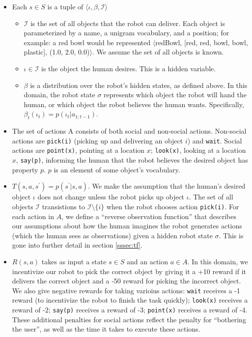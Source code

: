 \documentclass{article}
\newcommand{\Iota}{\mathcal{I}}
\begin{document}
\begin{itemize}
	\item Each $s \in S$ is a tuple of $\langle \iota, \beta, \Iota \rangle$		\begin{itemize}
			\item $\Iota$ is the set of all objects that the robot can deliver. Each object is parameterized by a name, a unigram vocabulary, and a position; for example: a red bowl would be represented $\langle$redBowl, [red, red, bowl, bowl, plastic], (1.0, 2.0, 0.0)$\rangle$. We assume the set of all objects is known. 
			\item $\iota \in \Iota$ is the object the human desires. This is a hidden variable. 
			\item $\beta$ is a distribution over the robot's hidden states, as defined above. In this domain, the robot state $\sigma$ represents which object the robot will hand the human, or which object the robot believes the human wants. Specifically, $\beta_t(\iota_t) = p(\iota_t | a_{1:t-1})$.
		\end{itemize}
	\item The set of actions A consists of both social and non-social actions. Non-social actions are \texttt{pick(i)} (picking up  and delivering an object $i$) and \texttt{wait}. Social actions are \texttt{point(x)}, pointing at a location $x$; \texttt{look(x)}, looking at a location $x$, \texttt{say(p)}, informing the human that the robot believes the desired object has property $p$. $p$ is an element of some object's vocabulary. 
	\item $T(s, a, s^\prime) = p(s^\prime | s, a)$. We make the assumption that the human's desired object $\iota$ does not change unless the robot picks up object $\iota$. The set of all objects $\Iota$ transistions to $\Iota \setminus \{i\}$ when the robot chooses action \texttt{pick(i)}. For each action in $A$, we define a ``reverse observation function'' that describes our assumptions about how the human imagines the robot generates actions (which the human sees as observations) given a hidden robot state $\sigma$. This is gone into further detail in section  \ref{sssec:tf}. 
	\item $R(s, a)$ takes as input a state $s \in S$ and an action $a \in A$. In this domain, we incentivize our robot to pick the correct object by giving it a +10 reward if it delivers the correct object and a -50 reward for picking the incorrect object. We also give negative rewards for taking varioius actions: \texttt{wait} receives a -1 reward (to incentivize the robot to finish the task quickly); \texttt{look(x)} receives a reward of -2; \texttt{say(p)} receives a reward of -3; \texttt{point(x)}  receives a reward of -4. These additional penalties for social actions reflect the penalty for ``bothering the user'', as well as the time it takes to execute these actions. 

\end{itemize}
\end{document}
